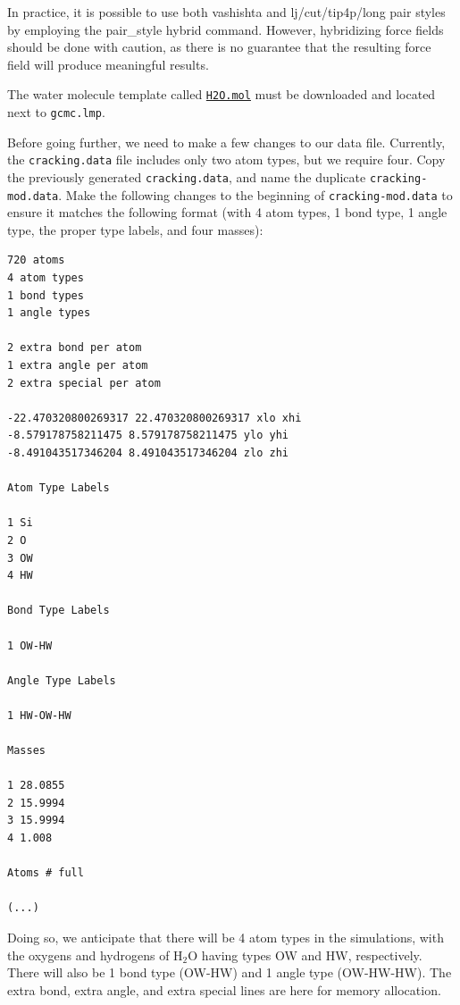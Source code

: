 \documentclass[9pt,tutorial]{livecoms}
\newcommand{\lmpcmd}[1]{\colorbox{listing}{\textcolor{command}{\small{#1}}}} %
\newcommand{\flecmd}[1]{\textcolor{command}{\texttt{#1}}} %
\newcommand{\dwlcmd}[1]{\textcolor{download}{\texttt{#1}}} %
\newcommand{\filepath}{https://raw.githubusercontent.com/lammpstutorials/lammpstutorials-article/main/files/}
\begin{document}
\begin{note}
{\color{blue}In practice, it is possible to use both \lmpcmd{vashishta} and
\lmpcmd{lj/cut/tip4p/long} pair styles by employing the \lmpcmd{pair\_style hybrid}
command.  However, hybridizing force fields should be done with caution, as there
is no guarantee that the resulting force field will produce meaningful results.}
\end{note}

The water molecule template called \href{\filepath tutorial6/H2O.mol}{\dwlcmd{H2O.mol}}
must be downloaded and located next to \flecmd{gcmc.lmp}.

Before going further, we need to make a few changes to our data file.
Currently, the \flecmd{cracking.data} file includes only two atom types, but we require four.
Copy the previously generated \flecmd{cracking.data}, and name the duplicate \flecmd{cracking-mod.data}.
Make the following changes to the beginning of \flecmd{cracking-mod.data}
to ensure it matches the following format (with 4 atom types,
1 bond type, 1 angle type, the proper type labels, and four masses):
\begin{lstlisting}
720 atoms
4 atom types
1 bond types
1 angle types

2 extra bond per atom
1 extra angle per atom
2 extra special per atom

-22.470320800269317 22.470320800269317 xlo xhi
-8.579178758211475 8.579178758211475 ylo yhi
-8.491043517346204 8.491043517346204 zlo zhi

Atom Type Labels

1 Si
2 O
3 OW
4 HW

Bond Type Labels

1 OW-HW

Angle Type Labels

1 HW-OW-HW

Masses

1 28.0855
2 15.9994
3 15.9994
4 1.008

Atoms # full

(...)
\end{lstlisting}
Doing so, we anticipate that there will be 4 atom types in the simulations,
with the oxygens and hydrogens of $\text{H}_2\text{O}$ having
types \lmpcmd{OW} and \lmpcmd{HW}, respectively.  There
will also be 1 bond type (\lmpcmd{OW-HW}) and 1 angle type (\lmpcmd{OW-HW-HW}).
The \lmpcmd{extra bond}, \lmpcmd{extra angle}, and
\lmpcmd{extra special} lines are here for memory allocation.
\end{document}
